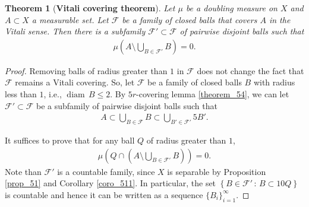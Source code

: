\documentclass[11pt]{book}
\newtheorem{theorem}{Theorem}[chapter]
\theoremstyle{definition}
\numberwithin{equation}{chapter}
\def\diam{{\operatorname{diam}\,}}
\begin{document}
\medskip

\begin{theorem}[{\bf Vitali covering theorem}]\label{theorem_55}
Let $\mu$ be a doubling measure on $X$ and $A \subset X$ a measurable set. Let $\mathcal{F}$ be a family of closed balls that covers $A$ in the Vitali sense. Then there is a subfamily $\mathcal{F}' \subset \mathcal{F}$ of pairwise disjoint balls such that
\begin{align*}
    \mu \left(A \setminus \bigcup_{B \in \mathcal{F}'} B\right) = 0.
\end{align*}
\end{theorem}
\begin{proof}
Removing balls of radius greater than $1$ in $\mathcal{F}$ does not change the fact that $\mathcal{F}$ remains a Vitali covering. So, let $\mathcal{F}$ be a family of closed balls $B$ with radius less than $1$, i.e., $\diam B \leq 2$. By $5r$-covering lemma \ref{theorem_54}, we can let $\mathcal{F}' \subset \mathcal{F}$ be a subfamily of pairwise disjoint balls such that 
\begin{align*}
    A \subset \bigcup_{B \in \mathcal{F}} B \subset \bigcup_{B' \in \mathcal{F}'} 5B'.
\end{align*}

It suffices to prove that for any ball $Q$ of radius greater than $1$,
\begin{align*}
    \mu \left(Q \cap \left(A \setminus \bigcup_{B \in \mathcal{F}'} B\right)\right) = 0.
\end{align*}
Note than $\mathcal{F}'$ is a countable family, since $X$ is separable by Proposition \ref{prop_51} and Corollary \ref{coro_511}. In particular, the set $\left\{B \in \mathcal{F}' \,:\, B \subset 10Q \right\}$ is countable and hence it can be written as a sequence $\{B_i\}^\infty_{i=1}$. 


\end{proof}
\end{document}

